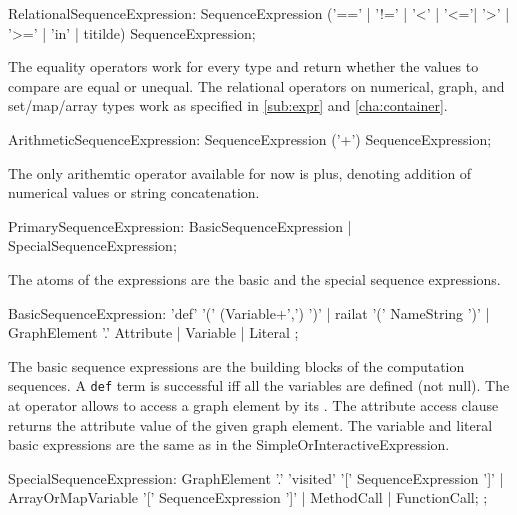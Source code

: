 \begin{rail}
  RelationalSequenceExpression: 
    SequenceExpression ('==' | '!=' | '<' | '<='| '>' | '>=' | 'in' | titilde) SequenceExpression;
\end{rail}

The equality operators work for every type and return whether the values to compare are equal or unequal.
The relational operators on numerical, graph, and set/map/array types work as specified in \ref{sub:expr} and \ref{cha:container}.

\begin{rail}
  ArithmeticSequenceExpression:
    SequenceExpression ('+') SequenceExpression;
\end{rail}

The only arithemtic operator available for now is plus, denoting addition of numerical values or string concatenation.

\begin{rail}
  PrimarySequenceExpression:
    BasicSequenceExpression |
    SpecialSequenceExpression;
\end{rail}

The atoms of the expressions are the basic and the special sequence expressions.

\begin{rail}
  BasicSequenceExpression:
    'def' '(' (Variable+',') ')' |
	  railat '(' NameString ')' |
 	  GraphElement '.' Attribute |
	  Variable | 
    Literal
  ;
\end{rail}

The basic sequence expressions are the building blocks of the computation sequences.
A \texttt{def} term is successful iff all the variables are defined (not null).
The at operator allows to access a graph element by its .
The attribute access clause returns the attribute value of the given graph element.
The variable and literal basic expressions are the same as in the SimpleOrInteractiveExpression.

\begin{rail}
  SpecialSequenceExpression:
    GraphElement '.' 'visited' '[' SequenceExpression ']' |
    ArrayOrMapVariable '[' SequenceExpression ']' |
    MethodCall |
    FunctionCall;
  ;
\end{rail}

